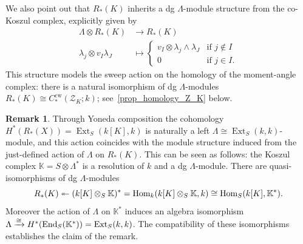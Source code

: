 \documentclass[a4paper,10pt]{amsart}
\theoremstyle{definition}
\newtheorem{remark}[theorem]{Remark}
\theoremstyle{remark}
\DeclareMathOperator{\Ext}{Ext}
\begin{document}
We also point out that $R_*(K)$ inherits a dg $\Lambda$-module structure from the co-Koszul complex, explicitly given by
\begin{align*}
    \Lambda\otimes R_*(K) &\longrightarrow R_*(K) \\
    \lambda_j\otimes v_I\lambda_J\; &\longmapsto \begin{cases} v_I\otimes \lambda_j\wedge \lambda_J & \text{if } j\notin I \\ 0 & \text{if } j\in I. \end{cases}
\end{align*}
This structure models the sweep action on the homology of the moment-angle complex: there is a natural isomorphism of dg $\Lambda$-modules $R_*(K)\cong C^\mathrm{cw}_*(\mathcal{Z}_K;k)$; see~\cref{prop_homology_Z_K} below. 

\begin{remark}
Through Yoneda composition the cohomology $H^*(R_*(X))=\Ext_S(k[K],k)$ is naturally a left $\Lambda\cong \Ext_S(k,k)$-module, and this action coincides with the module structure induced from the just-defined  action of $\Lambda$ on $R_*(K)$. This can be seen as follows: the Koszul complex $\mathbb{K}= S\otimes \Lambda^*$ is a resolution of $k$ and a dg  $\Lambda$-module. There are quasi-isomorphisms of dg $\Lambda$-modules
\[
R_*(K)\twoheadleftarrow (k[K]\otimes_S \mathbb{K})^*={\rm Hom}_k(k[K]\otimes_S \mathbb{K},k) \cong {\rm Hom}_S(k[K], \mathbb{K}^*). 
\]
Moreover the action of $\Lambda$ on $\mathbb{K^*}$ induces an algebra isomorphism $\Lambda \xrightarrow{\cong} H^*({\rm End}_S(\mathbb{K}^*))= \Ext_S(k,k)$.
The compatibility of these isomorphisms establishes the claim of the remark.
\end{remark}
\end{document}
